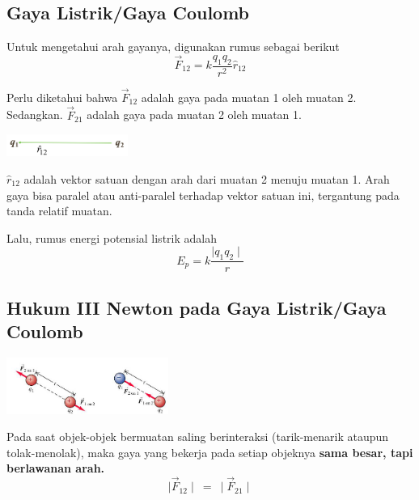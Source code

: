 \documentclass[twocolumn, 11pt]{article}%
\begin{document}
        \subsection{Gaya Listrik/Gaya Coulomb}
        Untuk mengetahui arah gayanya, digunakan rumus sebagai berikut
        \[\vec F_{12} = k \frac{q_1 q_2}{r^2} \hat r_{12} \]

        Perlu diketahui bahwa $\vec F_{12}$ adalah gaya pada muatan 1 oleh muatan 2. Sedangkan. $\vec F_{21}$ adalah gaya pada muatan 2 oleh muatan 1.
         
        \begin{center}
            \includegraphics[width=150px]{1.png} 
        \end{center}

        $\hat r_{12}$ adalah vektor satuan dengan arah dari muatan 2 menuju muatan 1. Arah gaya bisa paralel atau anti-paralel terhadap vektor satuan ini, tergantung pada tanda relatif muatan.

        Lalu, rumus energi potensial listrik adalah
        \[E_p = k \frac{\mid q_1 q_2 \mid}{r} \]

        \subsection{Hukum III Newton pada Gaya Listrik/Gaya Coulomb}
        \begin{center}
           \includegraphics[width=200px]{2.png}
        \end{center}

        Pada saat objek-objek bermuatan saling berinteraksi (tarik-menarik ataupun tolak-menolak), maka gaya yang bekerja pada setiap objeknya \textbf{sama besar, tapi berlawanan arah.}
        \[\mid \vec F_{12}\mid\ =\ \mid \vec F_{21} \mid \]
       
\end{document}
